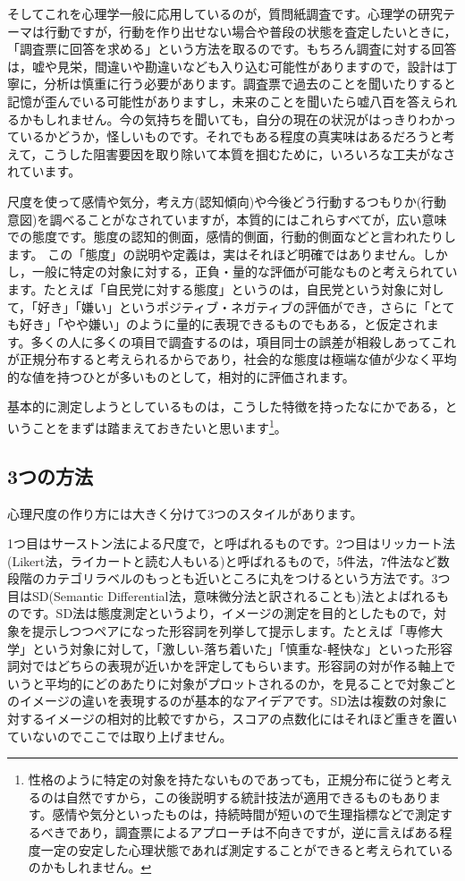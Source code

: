 \documentclass{ltjsbook}
\begin{document}
そしてこれを心理学一般に応用しているのが，質問紙調査です。心理学の研究テーマは行動ですが，行動を作り出せない場合や普段の状態を査定したいときに，「調査票に回答を求める」という方法を取るのです。もちろん調査に対する回答は，嘘や見栄，間違いや勘違いなども入り込む可能性がありますので，設計は丁寧に，分析は慎重に行う必要があります。調査票で過去のことを聞いたりすると記憶が歪んでいる可能性がありますし，未来のことを聞いたら嘘八百を答えられるかもしれません。今の気持ちを聞いても，自分の現在の状況がはっきりわかっているかどうか，怪しいものです。それでもある程度の真実味はあるだろうと考えて，こうした阻害要因を取り除いて本質を掴むために，いろいろな工夫がなされています。

尺度を使って感情や気分，考え方(認知傾向)や今後どう行動するつもりか(行動意図)を調べることがなされていますが，本質的にはこれらすべてが，広い意味での態度です。態度の認知的側面，感情的側面，行動的側面などと言われたりします\citep{Fujihara2001}。
この「態度」の説明や定義は，実はそれほど明確ではありません。しかし，一般に特定の対象に対する，正負・量的な評価が可能なものと考えられています。たとえば「自民党に対する態度」というのは，自民党という対象に対して，「好き」「嫌い」というポジティブ・ネガティブの評価ができ，さらに「とても好き」「やや嫌い」のように量的に表現できるものでもある，と仮定されます。多くの人に多くの項目で調査するのは，項目同士の誤差が相殺しあってこれが正規分布すると考えられるからであり，社会的な態度は極端な値が少なく平均的な値を持つひとが多いものとして，相対的に評価されます。

基本的に測定しようとしているものは，こうした特徴を持ったなにかである，ということをまずは踏まえておきたいと思います\footnote{性格のように特定の対象を持たないものであっても，正規分布に従うと考えるのは自然ですから，この後説明する統計技法が適用できるものもあります。感情や気分といったものは，持続時間が短いので生理指標などで測定するべきであり，調査票によるアプローチは不向きですが，逆に言えばある程度一定の安定した心理状態であれば測定することができると考えられているのかもしれません。}。

\subsection{3つの方法}
心理尺度の作り方には大きく分けて3つのスタイルがあります。

1つ目はサーストン法による尺度で，と呼ばれるものです。2つ目はリッカート法(Likert法，ライカートと読む人もいる)と呼ばれるもので，5件法，7件法など数段階のカテゴリラベルのもっとも近いところに丸をつけるという方法です。3つ目はSD(Semantic Differential法，意味微分法と訳されることも)法とよばれるものです。SD法は態度測定というより，イメージの測定を目的としたもので，対象を提示しつつペアになった形容詞を列挙して提示します。たとえば「専修大学」という対象に対して，「激しい-落ち着いた」「慎重な-軽快な」といった形容詞対ではどちらの表現が近いかを評定してもらいます。形容詞の対が作る軸上でいうと平均的にどのあたりに対象がプロットされるのか，を見ることで対象ごとのイメージの違いを表現するのが基本的なアイデアです。SD法は複数の対象に対するイメージの相対的比較ですから，スコアの点数化にはそれほど重きを置いていないのでここでは取り上げません。
\end{document}
